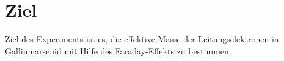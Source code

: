 \section{Ziel}
Ziel des Experiments ist es, die effektive Masse der Leitungselektronen
in Galliumarsenid mit Hilfe des Faraday-Effekts zu bestimmen.
